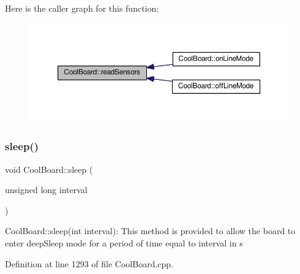 Here is the caller graph for this function\+:
\nopagebreak
\begin{figure}[H]
\begin{center}
\leavevmode
\includegraphics[width=350pt]{d7/df9/class_cool_board_ad03abdce2e65f520bbf2cff0f2d083cf_icgraph}
\end{center}
\end{figure}
\mbox{\label{class_cool_board_a069952cdcb2e7f68518aa429eceadb6e}} 
\subsubsection{\texorpdfstring{sleep()}{sleep()}}
{\footnotesize\ttfamily void Cool\+Board\+::sleep (\begin{DoxyParamCaption}\item[{unsigned long}]{interval }\end{DoxyParamCaption})}

Cool\+Board\+::sleep(int interval)\+: This method is provided to allow the board to enter deep\+Sleep mode for a period of time equal to interval in s 

Definition at line 1293 of file Cool\+Board.\+cpp.


